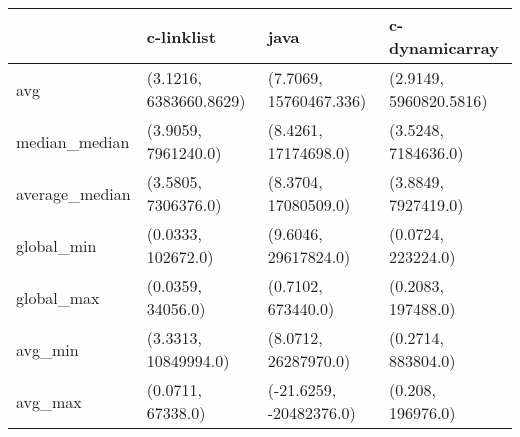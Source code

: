 \begin{tabular}{llll}
\toprule
{} &              c-linklist &                     java &          c-dynamicarray \\
\midrule
avg            &  (3.1216, 6383660.8629) &   (7.7069, 15760467.336) &  (2.9149, 5960820.5816) \\
median\_median  &     (3.9059, 7961240.0) &     (8.4261, 17174698.0) &     (3.5248, 7184636.0) \\
average\_median &     (3.5805, 7306376.0) &     (8.3704, 17080509.0) &     (3.8849, 7927419.0) \\
global\_min     &      (0.0333, 102672.0) &     (9.6046, 29617824.0) &      (0.0724, 223224.0) \\
global\_max     &       (0.0359, 34056.0) &       (0.7102, 673440.0) &      (0.2083, 197488.0) \\
avg\_min        &    (3.3313, 10849994.0) &     (8.0712, 26287970.0) &      (0.2714, 883804.0) \\
avg\_max        &       (0.0711, 67338.0) &  (-21.6259, -20482376.0) &       (0.208, 196976.0) \\
\bottomrule
\end{tabular}
